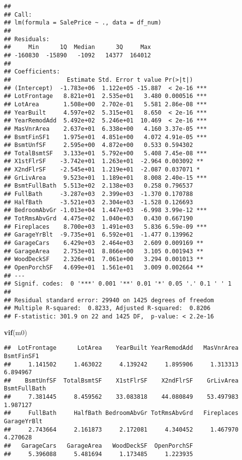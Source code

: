 \documentclass[
]{article}
\newenvironment{Shaded}{\begin{snugshade}}{\end{snugshade}}
\newcommand{\FunctionTok}[1]{\textcolor[rgb]{0.13,0.29,0.53}{\textbf{#1}}}
\newcommand{\NormalTok}[1]{#1}
\begin{document}
\begin{verbatim}
## 
## Call:
## lm(formula = SalePrice ~ ., data = df_num)
## 
## Residuals:
##     Min      1Q  Median      3Q     Max 
## -160830  -15890   -1092   14377  164012 
## 
## Coefficients:
##                Estimate Std. Error t value Pr(>|t|)    
## (Intercept)  -1.783e+06  1.122e+05 -15.887  < 2e-16 ***
## LotFrontage   8.821e+01  2.535e+01   3.480 0.000516 ***
## LotArea       1.508e+00  2.702e-01   5.581 2.86e-08 ***
## YearBuilt     4.597e+02  5.315e+01   8.650  < 2e-16 ***
## YearRemodAdd  5.492e+02  5.246e+01  10.469  < 2e-16 ***
## MasVnrArea    2.637e+01  6.338e+00   4.160 3.37e-05 ***
## BsmtFinSF1    1.975e+01  4.851e+00   4.072 4.91e-05 ***
## BsmtUnfSF     2.595e+00  4.872e+00   0.533 0.594302    
## TotalBsmtSF   3.133e+01  5.792e+00   5.408 7.45e-08 ***
## X1stFlrSF    -3.742e+01  1.263e+01  -2.964 0.003092 ** 
## X2ndFlrSF    -2.545e+01  1.219e+01  -2.087 0.037071 *  
## GrLivArea     9.523e+01  1.189e+01   8.008 2.40e-15 ***
## BsmtFullBath  5.513e+02  2.138e+03   0.258 0.796537    
## FullBath     -3.287e+03  2.399e+03  -1.370 0.170788    
## HalfBath     -3.521e+03  2.304e+03  -1.528 0.126693    
## BedroomAbvGr -1.013e+04  1.447e+03  -6.998 3.99e-12 ***
## TotRmsAbvGrd  4.475e+02  1.040e+03   0.430 0.667190    
## Fireplaces    8.700e+03  1.491e+03   5.836 6.59e-09 ***
## GarageYrBlt  -9.735e+01  6.592e+01  -1.477 0.139962    
## GarageCars    6.429e+03  2.464e+03   2.609 0.009169 ** 
## GarageArea    2.753e+01  8.866e+00   3.105 0.001943 ** 
## WoodDeckSF    2.326e+01  7.061e+00   3.294 0.001013 ** 
## OpenPorchSF   4.699e+01  1.561e+01   3.009 0.002664 ** 
## ---
## Signif. codes:  0 '***' 0.001 '**' 0.01 '*' 0.05 '.' 0.1 ' ' 1
## 
## Residual standard error: 29940 on 1425 degrees of freedom
## Multiple R-squared:  0.8233, Adjusted R-squared:  0.8206 
## F-statistic: 301.9 on 22 and 1425 DF,  p-value: < 2.2e-16
\end{verbatim}

\begin{Shaded}
\begin{Highlighting}[]
\FunctionTok{vif}\NormalTok{(m0)}
\end{Highlighting}
\end{Shaded}

\begin{verbatim}
##  LotFrontage      LotArea    YearBuilt YearRemodAdd   MasVnrArea   BsmtFinSF1 
##     1.141502     1.463022     4.139242     1.895906     1.313313     6.894967 
##    BsmtUnfSF  TotalBsmtSF    X1stFlrSF    X2ndFlrSF    GrLivArea BsmtFullBath 
##     7.381445     8.459562    33.083818    44.080849    53.497983     1.987127 
##     FullBath     HalfBath BedroomAbvGr TotRmsAbvGrd   Fireplaces  GarageYrBlt 
##     2.743664     2.161873     2.172081     4.340452     1.467970     4.270628 
##   GarageCars   GarageArea   WoodDeckSF  OpenPorchSF 
##     5.396088     5.481694     1.173485     1.223935
\end{verbatim}
\end{document}
